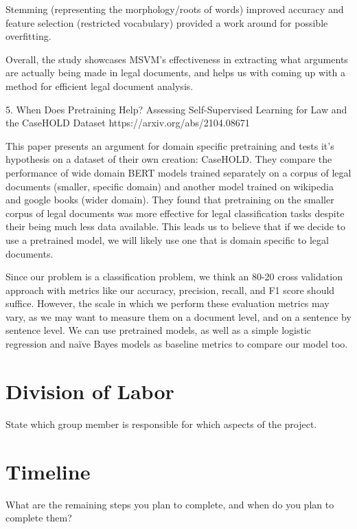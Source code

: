 \documentclass[11pt,a4paper]{article}
\begin{document}
Stemming (representing the morphology/roots of words) improved accuracy and feature selection (restricted vocabulary) provided a work around for possible overfitting.

Overall, the study showcases MSVM's effectiveness in extracting what arguments are actually being made in legal documents,
and helps us with coming up with a method for efficient legal document analysis.

5. When Does Pretraining Help? Assessing Self-Supervised Learning for Law and the CaseHOLD Dataset
https://arxiv.org/abs/2104.08671

This paper presents an argument for domain specific pretraining and tests it's hypothesis on a dataset of their own creation: CaseHOLD. They compare the performance of wide domain BERT models trained separately on a corpus of legal documents (smaller, specific domain) and another model trained on wikipedia and google books (wider domain). They found that pretraining on the smaller corpus of legal documents was more effective for legal classification tasks despite their being much less data available. This leads us to believe that if we decide to use a pretrained model, we will likely use one that is domain specific to legal documents. 

Since our problem is a classification problem, we think an 80-20 cross validation approach with metrics like our accuracy, precision, recall, and F1 score should suffice. However, the scale in which we perform these evaluation metrics may vary, as we may want to measure them on a document level, and on a sentence by sentence level. We can use pretrained models, as well as a simple logistic regression and naïve Bayes models as baseline metrics to compare our model too. 

\section{Division of Labor}
State which group member is responsible for which aspects of the project.

\section{Timeline}
What are the remaining steps you plan to complete, and when do you plan to complete them?
\end{document}
